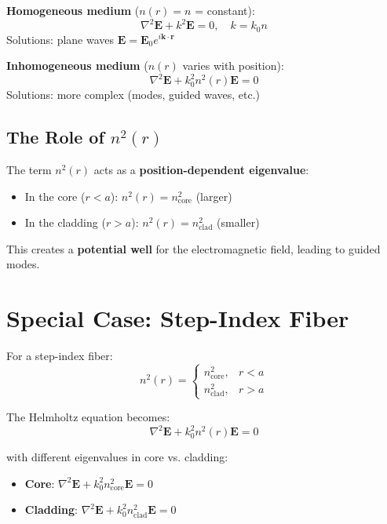 \documentclass[12pt]{article}
\begin{document}
\textbf{Homogeneous medium} ($n(r) = n$ = constant):
\begin{equation}
\nabla^2 \mathbf{E} + k^2 \mathbf{E} = 0, \quad k = k_0 n
\end{equation}
Solutions: plane waves $\mathbf{E} = \mathbf{E}_0 e^{i\mathbf{k} \cdot \mathbf{r}}$

\textbf{Inhomogeneous medium} ($n(r)$ varies with position):
\begin{equation}
\nabla^2 \mathbf{E} + k_0^2 n^2(r) \mathbf{E} = 0
\end{equation}
Solutions: more complex (modes, guided waves, etc.)

\subsection{The Role of $n^2(r)$}

The term $n^2(r)$ acts as a \textbf{position-dependent eigenvalue}:
\begin{itemize}
\item In the core ($r < a$): $n^2(r) = n_{\text{core}}^2$ (larger)
\item In the cladding ($r > a$): $n^2(r) = n_{\text{clad}}^2$ (smaller)
\end{itemize}

This creates a \textbf{potential well} for the electromagnetic field, leading to guided modes.

\section{Special Case: Step-Index Fiber}

For a step-index fiber:
\begin{equation}
n^2(r) = \begin{cases}
n_{\text{core}}^2, & r < a \\
n_{\text{clad}}^2, & r > a
\end{cases}
\end{equation}

The Helmholtz equation becomes:
\begin{equation}
\nabla^2 \mathbf{E} + k_0^2 n^2(r) \mathbf{E} = 0
\end{equation}

with different eigenvalues in core vs. cladding:
\begin{itemize}
\item \textbf{Core}: $\nabla^2 \mathbf{E} + k_0^2 n_{\text{core}}^2 \mathbf{E} = 0$
\item \textbf{Cladding}: $\nabla^2 \mathbf{E} + k_0^2 n_{\text{clad}}^2 \mathbf{E} = 0$
\end{itemize}
\end{document}
